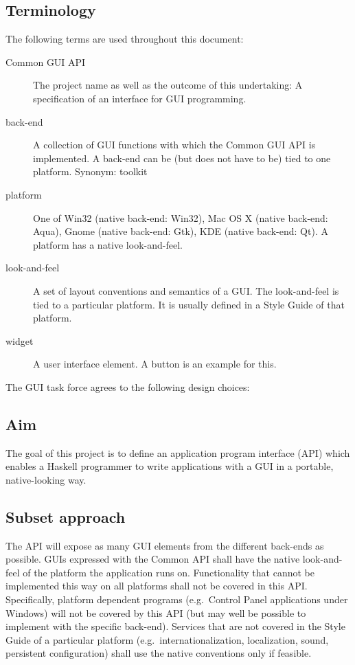 \documentclass{article}
\begin{document}
\subsection{Terminology}
The following terms are used throughout this document:
\begin{description}
\item[Common GUI API] The project name as well as the outcome of this
  undertaking: A specification of an interface for GUI programming.
\item[back-end] A collection of GUI functions with which the Common GUI
  API is implemented. A back-end can be (but does not have to be) tied
  to one platform. Synonym: toolkit
\item[platform] One of Win32 (native back-end: Win32), Mac OS X
  (native back-end: Aqua), Gnome (native back-end: Gtk), KDE (native
  back-end: Qt).  A platform has a native look-and-feel.
\item[look-and-feel] A set of layout conventions and semantics of a
  GUI. The look-and-feel is tied to a particular platform. It is
  usually defined in a Style Guide of that platform.
\item[widget] A user interface element. A button is an example for this.
\end{description}


The GUI task force agrees to the following design choices:

\subsection{Aim}
The goal of this project is to define an application program interface
(API) which enables a Haskell programmer to write applications with a
GUI in a portable, native-looking way.

\subsection{Subset approach}
The API will expose as many GUI elements from the different back-ends
as possible. GUIs expressed with the Common API shall have the native
look-and-feel of the platform the application runs on.  Functionality
that cannot be implemented this way on all platforms shall not be
covered in this API. Specifically, platform dependent programs
(e.g.~Control Panel applications under Windows) will not be covered by
this API (but may well be possible to implement with the specific
back-end).  Services that are not covered in the Style Guide of a
particular platform (e.g.~internationalization, localization, sound,
persistent configuration) shall use the native conventions only if
feasible.
\end{document}
